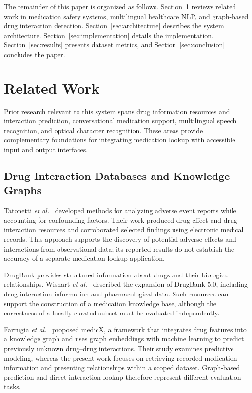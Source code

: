 \documentclass[9pt,journal,twoside,web]{ieeecolor}
\begin{document}
The remainder of this paper is organized as follows. Section~\ref{sec:related-work} reviews related work in medication safety systems, multilingual healthcare NLP, and graph-based drug interaction detection. Section~\ref{sec:architecture} describes the system architecture. Section~\ref{sec:implementation} details the implementation. Section~\ref{sec:results} presents dataset metrics, and Section~\ref{sec:conclusion} concludes the paper.

\section{Related Work}
\label{sec:related-work}
Prior research relevant to this system spans drug information resources and interaction prediction, conversational medication support, multilingual speech recognition, and optical character recognition. These areas provide complementary foundations for integrating medication lookup with accessible input and output interfaces.

\subsection{Drug Interaction Databases and Knowledge Graphs}
Tatonetti \emph{et al.}~\cite{tatonetti2012} developed methods for analyzing adverse event reports while accounting for confounding factors. Their work produced drug-effect and drug-interaction resources and corroborated selected findings using electronic medical records. This approach supports the discovery of potential adverse effects and interactions from observational data; its reported results do not establish the accuracy of a separate medication lookup application.

DrugBank provides structured information about drugs and their biological relationships. Wishart \emph{et al.}~\cite{wishart2018} described the expansion of DrugBank 5.0, including drug interaction information and pharmacological data. Such resources can support the construction of a medication knowledge base, although the correctness of a locally curated subset must be evaluated independently.

Farrugia \emph{et al.}~\cite{farrugia2023} proposed medicX, a framework that integrates drug features into a knowledge graph and uses graph embeddings with machine learning to predict previously unknown drug--drug interactions. Their study examines predictive modeling, whereas the present work focuses on retrieving recorded medication information and presenting relationships within a scoped dataset. Graph-based prediction and direct interaction lookup therefore represent different evaluation tasks.
\end{document}
